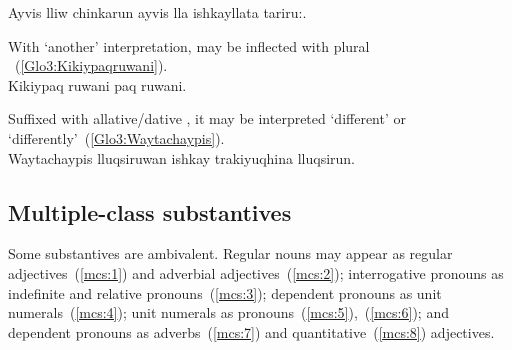 {%
%
{Ayvis lliw chinkarun ayvis lla ishkayllata tariru:.}%
{}%
{}{}%

\noindent
With ‘another’ interpretation,  may be inflected with plural ~(\ref{Glo3:Kikiypaqruwani}).\\

%
{Kikiypaq ruwani paq ruwani.}%
{}%
{}{}%

\noindent
Suffixed with allative/dative , it may be interpreted ‘different’ or ‘differently’~(\ref{Glo3:Waytachaypis}).\\

%
{Waytachaypis  lluqsiruwan ishkay trakiyuqhina lluqsirun.}%
{}%
{}{}%

\subsection{Multiple-class substantives}\label{sec:mcsub}
Some substantives are ambivalent. Regular nouns may appear as regular adjectives~(\ref{mcs:1}) and adverbial adjectives~(\ref{mcs:2}); interrogative pronouns as indefinite and relative pronouns~(\ref{mcs:3}); dependent pronouns as unit numerals~(\ref{mcs:4}); unit numerals as pronouns~(\ref{mcs:5}),~(\ref{mcs:6}); and dependent pronouns as adverbs~(\ref{mcs:7}) and quantitative~(\ref{mcs:8}) adjectives.

}
